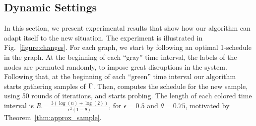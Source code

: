 
\subsection{Dynamic Settings}\label{sec:dynset}
In this section, we present experimental results that show how our algorithm can
adapt itself to the new situation. The experiment is illustrated in
Fig.~\ref{figure:changes}. For each graph, we start by following an optimal
1-schedule in the graph. At the beginning of each ``gray'' time interval, the
labels of the nodes are permuted randomly, to impose great disruptions in the
system. Following that, at
the beginning of each ``green'' time interval our algorithm starts gathering
samples of $\Gamma$. Then, \algonameapx computes the schedule for the new sample, using 50 rounds of iterations, and starts probing. The length of each colored time
interval is $R = \frac{3(\log(n)+\log(2))}{\epsilon^2(1-\theta)}$, for $\epsilon=0.5$ and $\theta = 0.75$, motivated by
Theorem~\ref{thm:approx_sample}.


